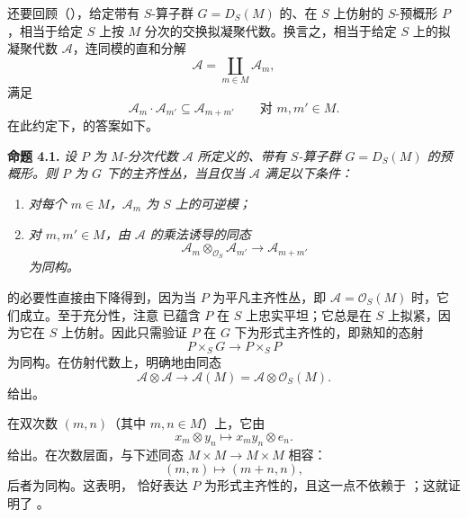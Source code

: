 还要回顾（），给定带有 \(S\)-算子群 \(G=D_S(M)\) 的、在 \(S\) 上仿射的 \(S\)-预概形 \(P\)，相当于给定 \(S\) 上按 \(M\) 分次的交换拟凝聚代数。换言之，相当于给定 \(S\) 上的拟凝聚代数 \(\mathscr A\)，连同模的直和分解
\[
  \mathscr A=\coprod_{m\in M}\mathscr A_m,
\]
满足
\[
  \mathscr A_m\mathbin{\cdot}\mathscr A_{m'}
  \subseteq\mathscr A_{m+m'}
  \qquad\text{对 }m,m'\in M.
\]
在此约定下，的答案如下。

\medskip
\noindent{}\textbf{命题 4.1.}
\textit{设 \(P\) 为 \(M\)-分次代数 \(\mathscr A\) 所定义的、带有 \(S\)-算子群 \(G=D_S(M)\) 的预概形。则 \(P\) 为 \(G\) 下的主齐性丛，当且仅当 \(\mathscr A\) 满足以下条件：}
\begin{enumerate}
  \item[(a)]
  \textit{对每个 \(m\in M\)，\(\mathscr A_m\) 为 \(S\) 上的可逆模；}

  \item[(b)]
  \textit{对 \(m,m'\in M\)，由 \(\mathscr A\) 的乘法诱导的同态}
  \[
    \mathscr A_m\otimes_{\mathcal O_S}\mathscr A_{m'}
    \longrightarrow\mathscr A_{m+m'}
  \]
  \textit{为同构。}
\end{enumerate}

的必要性直接由下降得到，因为当 \(P\) 为平凡主齐性丛，即 \(\mathscr A=\mathcal O_S(M)\) 时，它们成立。至于充分性，注意  已蕴含 \(P\) 在 \(S\) 上忠实平坦；它总是在 \(S\) 上拟紧，因为它在 \(S\) 上仿射。因此只需验证 \(P\) 在 \(G\) 下为形式主齐性的，即熟知的态射
\[
  P\times_SG\longrightarrow P\times_SP
\]
为同构。在仿射代数上，明确地由同态
\[
  \mathscr A\otimes\mathscr A
  \longrightarrow
  \mathscr A(M)=\mathscr A\otimes\mathcal O_S(M).
\]
给出。

在双次数 \((m,n)\)（其中 \(m,n\in M\)）上，它由
\[
  x_m\otimes y_n\longmapsto x_my_n\otimes e_n.
\]
给出。在次数层面，与下述同态 \(M\times M\to M\times M\) 相容：
\[
  (m,n)\longmapsto(m+n,n),
\]
后者为同构。这表明， 恰好表达 \(P\) 为形式主齐性的，且这一点不依赖于 ；这就证明了 。

